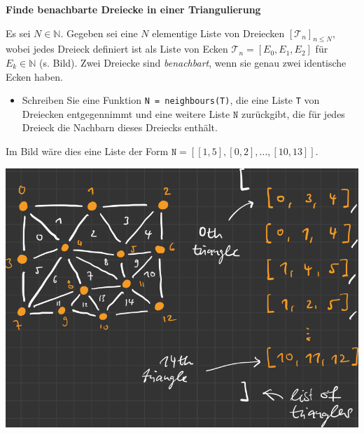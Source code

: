 \textbf{Finde benachbarte Dreiecke in einer Triangulierung}

Es sei $N \in \mathbb{N}$. Gegeben sei eine $N$ elementige Liste von Dreiecken $[\mathcal{T}_n]_{n\leq N}$, wobei jedes Dreieck definiert ist als Liste von Ecken $\mathcal{T}_n = [E_0, E_1, E_2 ]$ für $E_k \in \mathbb{N}$ (s. Bild). Zwei Dreiecke sind \textit{benachbart}, wenn sie genau zwei identische Ecken haben.
\begin{itemize}
	\item  Schreiben Sie eine Funktion \verb|N = neighbours(T)|, die eine Liste \texttt{T} von Dreiecken entgegennimmt und eine weitere Liste $\texttt{N}$ zurückgibt, die für jedes Dreieck die Nachbarn dieses Dreiecks enthält.
\end{itemize} 
Im Bild wäre dies eine Liste der Form $\texttt{N} = [[1,5], [0,2], \dots, [10,13]]$.
\begin{center}
	\includegraphics[scale=.8]{NeighbourCountTrianguation/example.png}
\end{center}
